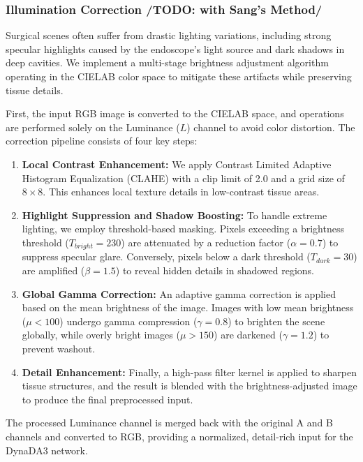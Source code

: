 \subsubsection{Illumination Correction /TODO: with Sang's Method/}
Surgical scenes often suffer from drastic lighting variations, including strong specular highlights caused by the endoscope's light source and dark shadows in deep cavities. We implement a multi-stage brightness adjustment algorithm operating in the CIELAB color space to mitigate these artifacts while preserving tissue details.

First, the input RGB image is converted to the CIELAB space, and operations are performed solely on the Luminance ($L$) channel to avoid color distortion. The correction pipeline consists of four key steps:

\begin{enumerate}
    \item \textbf{Local Contrast Enhancement:} We apply Contrast Limited Adaptive Histogram Equalization (CLAHE) with a clip limit of 2.0 and a grid size of $8\times8$. This enhances local texture details in low-contrast tissue areas.
    
    \item \textbf{Highlight Suppression and Shadow Boosting:} To handle extreme lighting, we employ threshold-based masking. Pixels exceeding a brightness threshold ($T_{bright}=230$) are attenuated by a reduction factor ($\alpha=0.7$) to suppress specular glare. Conversely, pixels below a dark threshold ($T_{dark}=30$) are amplified ($\beta=1.5$) to reveal hidden details in shadowed regions.
    
    \item \textbf{Global Gamma Correction:} An adaptive gamma correction is applied based on the mean brightness of the image. Images with low mean brightness ($\mu < 100$) undergo gamma compression ($\gamma=0.8$) to brighten the scene globally, while overly bright images ($\mu > 150$) are darkened ($\gamma=1.2$) to prevent washout.
    
    \item \textbf{Detail Enhancement:} Finally, a high-pass filter kernel is applied to sharpen tissue structures, and the result is blended with the brightness-adjusted image to produce the final preprocessed input.
\end{enumerate}

The processed Luminance channel is merged back with the original A and B channels and converted to RGB, providing a normalized, detail-rich input for the DynaDA3 network.
